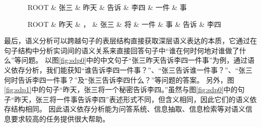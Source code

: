 \begin{figure}[htb]
	\begin{center}
			\begin{dependency}[arc edge, arc angle=80, text only label, label style={above}]
				\begin{deptext} [row sep=0.4cm, column sep=.1cm]
					\ ROOT \& 张三 \& 昨天 \& 告诉 \&  李四  \& 一件 \& 事 \\
				\end{deptext}
			\end{dependency}
	\end{center}
\end{figure}

\begin{figure}[htb]
	\begin{center}
			\begin{dependency}[arc edge, arc angle=80, text only label, label style={above}]
				\begin{deptext} [row sep=0.4cm, column sep=.1cm]
					\ ROOT \& 昨天 \& ， \& 张三 \&  将  \& 一件 \& 事 \& 告诉 \& 李四  \\
				\end{deptext}
			\end{dependency}
	\end{center}
\end{figure}


最后，语义分析可以跨越句子的表层结构直接获取深层语义表达的本质，它通过在句子结构中分析实词间的语义关系来直接回答句子中“谁在何时何地对谁做了什么”等问题。
以图\ref{fig:sdp0}中的中文句子“张三昨天告诉李四一件事”为例，通过语义依存分析，我们能获知“谁告诉李四一件事？”、“张三告诉谁一件事？”、“张三何时告诉李四一件事？”及“张三告诉李四什么？”等问题的答案。
另外，图\ref{fig:sdp1}中的句子“昨天，张三将一个秘密告诉李四。”虽然与图\ref{fig:sdp0}中的句子“昨天，张三将一件事告诉李四”表述形式不同，但含义相同，因此它们的语义依存结构相同。
因此语义依存分析能为问答系统、信息抽取、信息检索等对语义信息要求较高的任务提供很大帮助。

